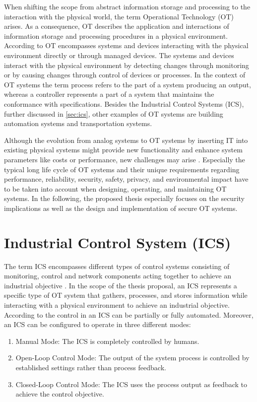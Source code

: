 When shifting the scope from abstract information storage and processing to the interaction with the physical world, the term Operational Technology (OT) arises.
As a consequence, OT describes the application and interactions of information storage and processing procedures in a physical environment.
According to \citeauthor{Stouffer2023} \cite{Stouffer2023} OT encompasses systems and devices interacting with the physical environment directly or through managed devices.
The systems and devices interact with the physical environment by detecting changes through monitoring or by causing changes through control of devices or processes.
In the context of OT systems the term process refers to the part of a system producing an output, whereas a controller represents a part of a system that maintains the conformance with specifications.
Besides the Industrial Control Systems (ICS), further discussed in \autoref{sec:ics}, other examples of OT systems are building automation systems and transportation systems.

Although the evolution from analog systems to OT systems by inserting IT into existing physical systems might provide new functionality and enhance system parameters like costs or performance, new challenges may arise \cite{Stouffer2023}.
Especially the typical long life cycle of OT systems and their unique requirements regarding performance, reliability, security, safety, privacy, and environmental impact have to be taken into account when designing, operating, and maintaining OT systems.
In the following, the proposed thesis especially focuses on the security implications as well as the design and implementation of secure OT systems.

\section{Industrial Control System (ICS)}
\label{sec:ics}
The term ICS encompasses different types of control systems consisting of monitoring, control and network components acting together to achieve an industrial objective \cite{Stouffer2015}.
In the scope of the thesis proposal, an ICS represents a specific type of OT system that gathers, processes, and stores information while interacting with a physical environment to achieve an industrial objective.
According to \citeauthor{Stouffer2015} \cite{Stouffer2015} the control in an ICS can be partially or fully automated.
Moreover, an ICS can be configured to operate in three different modes:
\begin{enumerate}
    \item Manual Mode: The ICS is completely controlled by humans.
    \item Open-Loop Control Mode: The output of the system process is controlled by established settings rather than process feedback.
    \item Closed-Loop Control Mode: The ICS uses the process output as feedback to achieve the control objective.
\end{enumerate}

